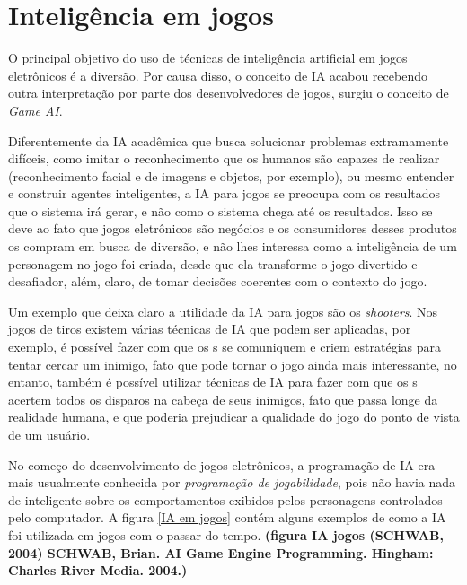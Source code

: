 
\section{Inteligência em jogos}

O principal objetivo do uso de técnicas de inteligência artificial em jogos eletrônicos é a diversão. Por causa disso, o conceito de IA acabou recebendo outra interpretação por parte dos desenvolvedores de jogos, surgiu o conceito de \textit{Game AI}.

Diferentemente da IA acadêmica que busca solucionar problemas extramamente difíceis, como imitar o reconhecimento que os humanos são capazes de realizar (reconhecimento facial e de imagens e objetos, por exemplo), ou mesmo entender e construir agentes inteligentes, a IA para jogos se preocupa com os resultados que o sistema irá gerar, e não como o sistema chega até os resultados. Isso se deve ao fato que jogos eletrônicos são negócios e os consumidores desses produtos os compram em busca de diversão, e não lhes interessa como a inteligência de um personagem no jogo foi criada, desde que ela transforme o jogo divertido e desafiador, além, claro, de tomar decisões coerentes com o contexto do jogo.

Um exemplo que deixa claro a utilidade da IA para jogos são os \textit{shooters}. Nos jogos de tiros existem várias técnicas de IA que podem ser aplicadas, por exemplo, é possível fazer com que os \npc{}s se comuniquem e criem estratégias para tentar cercar um inimigo, fato que pode tornar o jogo ainda mais interessante, no entanto, também é possível utilizar técnicas de IA para fazer com que os \npc{}s acertem todos os disparos na cabeça de seus inimigos, fato que passa longe da realidade humana, e que poderia prejudicar a qualidade do jogo do ponto de vista de um usuário.

No começo do desenvolvimento de jogos eletrônicos, a programação de IA era mais usualmente conhecida por \textit{programação de jogabilidade}, pois não havia nada de inteligente sobre os comportamentos exibidos pelos personagens controlados pelo computador. 
A figura \ref{IA em jogos} contém alguns exemplos de como a IA foi utilizada em jogos com o passar do tempo.
\textbf{(figura IA jogos (SCHWAB, 2004) SCHWAB, Brian. AI Game Engine Programming. Hingham: Charles River Media. 2004.)}

